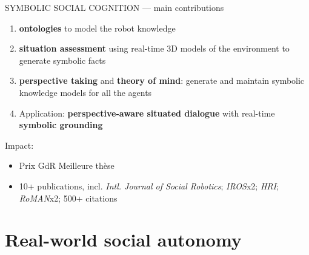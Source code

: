 \documentclass[xcolor=table]{beamer}
\begin{document}
{\begin{frame}
\begin{columns}
\begin{column}{0.3\linewidth}
            \end{column}
        \end{columns}



    \end{frame}
}

\begin{frame}{SYMBOLIC SOCIAL COGNITION --- main contributions}


    \begin{enumerate}
        \item \textbf{ontologies} to model the robot knowledge
        \item \textbf{situation assessment} using real-time 3D models of the
            environment to generate symbolic facts
        \item \textbf{perspective taking} and \textbf{theory of mind}: generate and
            maintain symbolic knowledge models for all the agents
        \item Application: \textbf{perspective-aware situated dialogue} with real-time \textbf{symbolic
            grounding}
    \end{enumerate}

Impact:
    \begin{itemize}
        \item Prix GdR Meilleure thèse
        \item 10+ publications, incl. \emph{Intl. Journal of Social Robotics};
            \emph{IROS}x2; \emph{HRI}; \emph{RoMAN}x2; 500+ citations
    \end{itemize}
\end{frame}

\section*{Real-world social autonomy}
\end{document}
